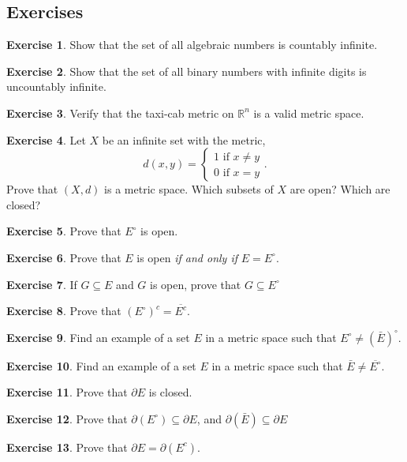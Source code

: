 \documentclass{article}
\newcommand{\R}{\mathbb{R}}
\theoremstyle{definition}
\newtheorem{ex}{Exercise}[section]
\begin{document}
	\subsection{Exercises}
	\begin{ex}
		Show that the set of all algebraic numbers is countably infinite.
	\end{ex}
	\begin{ex}
		Show that the set of all binary numbers with infinite digits is uncountably infinite.
	\end{ex}
	\begin{ex}
		Verify that the taxi-cab metric on $ \R^n $ is a valid metric space.
	\end{ex}
	\begin{ex}
		Let $ X $ be an infinite set with the metric, $$d(x,y)=\begin{cases}
			1\text{ if }x\neq y\\
			0\text{ if }x=y
		\end{cases} .$$ Prove that $ (X,d) $ is a metric space. Which subsets of $ X $ are open? Which are closed? 
	\end{ex}
	\begin{ex}
		Prove that $ E^\circ $ is open.
	\end{ex}
	\begin{ex}
		Prove that $ E $ is open \textit{if and only if} $ E=E^\circ $.
	\end{ex}
	\begin{ex}
		If $ G\subseteq E $ and $ G $ is open, prove that $ G\subseteq E^\circ $
	\end{ex}
	\begin{ex}
		Prove that $ (E^\circ)^c=\overline{E^c} $.
	\end{ex}
	\begin{ex}
		Find an example of a set $ E  $ in a metric space such that $ E^\circ\neq(\bar{E} )^\circ$.
	\end{ex}
	\begin{ex}
		Find an example of a set $ E  $ in a metric space such that $ \bar{E}\neq\overline{E^\circ}$.
	\end{ex}
	\begin{ex}
		Prove that $ \partial E $ is closed.
	\end{ex}
	\begin{ex}
		Prove that $ \partial(E^\circ)\subseteq \partial E  $, and $ \partial(\bar{E})\subseteq \partial E  $
	\end{ex}
	\begin{ex}
		Prove that $ \partial E=\partial (E^c)  $.
	\end{ex}
\end{document}
